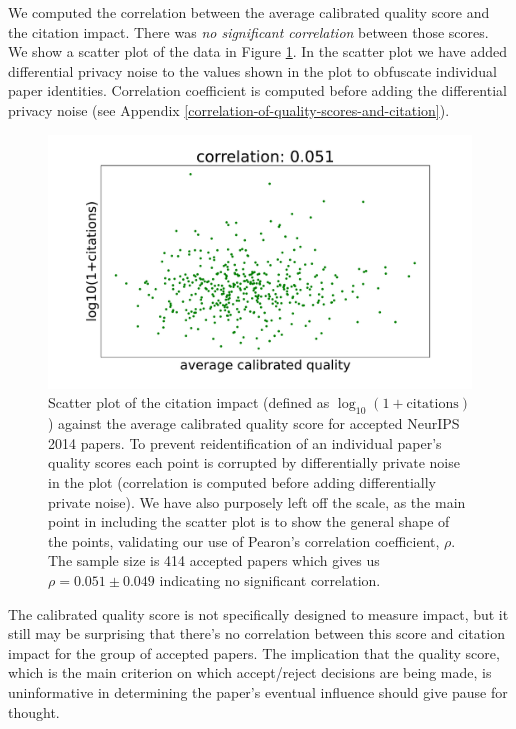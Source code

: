 \documentclass[twoside]{article}
\begin{document}
We computed the correlation between the average calibrated quality score and the citation impact. There was \emph{no significant correlation} between those scores. We show a scatter plot of the data in Figure \ref{figure-citations-vs-average-calibrated-quality-accept}. In the scatter plot we have added differential privacy noise to the values shown in the plot to obfuscate individual paper identities. Correlation coefficient is computed before adding the differential privacy noise (see Appendix \ref{correlation-of-quality-scores-and-citation}).

\begin{figure}[htb]
  \begin{center}
    \includegraphics[width=0.9\columnwidth]{diagrams/neurips/citations-vs-average-calibrated-quality-accept.pdf}
  \end{center}
  \caption{Scatter plot of the citation impact (defined as $\log_{10}(1+\text{citations})$) against the average calibrated quality score for accepted NeurIPS 2014 papers. To prevent reidentification of an individual paper's quality scores each point is corrupted by differentially private noise in the plot (correlation is computed before adding differentially private noise). We have also purposely left off the scale, as the main point in including the scatter plot is to show the general shape of the points, validating our use of Pearon's correlation coefficient, $\rho$. The sample size is 414 accepted papers which gives us $\rho = 0.051 \pm 0.049$ indicating no significant correlation.}
  \label{figure-citations-vs-average-calibrated-quality-accept}
\end{figure}

The calibrated quality score is not specifically designed to measure impact, but it still may be surprising that there's no correlation between this score and citation impact for the group of accepted papers. The implication that the quality score, which is the main criterion on which accept/reject decisions are being made, is uninformative in determining the paper's eventual influence should give pause for thought.
\end{document}
